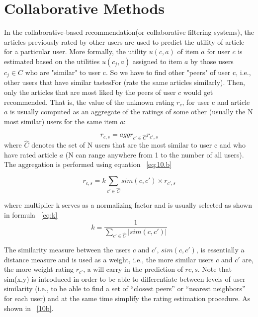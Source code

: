 \section{Collaborative Methods}\label{sec:coll}
In the collaborative-based recommendation(or collaborative filtering systems), the articles previously rated by other users are used to predict the utility of article for a particular user. More formally, the utility $u(c, a)$ of item $a$ for user $c$ is estimated based on the utilities $u(c_j, a)$ assigned to item $a$ by those users $c_j \in C$ who are "similar" to user c. So we have to find other "peers" of user c, i.e., other users that have similar tastesFor (rate the same articles similarly). Then, only the articles that are most liked by the peers of user $c$ would get recommended. 
That is, the value of the unknown rating $r_c$, for user c and article $a$ is usually computed as an aggregate of the ratings of some other (usually the N most similar) users for the same item $a$:

\begin{equation}\label{eq:9}
r_{c,s}=aggr_{c'\in \hat{C}} r_{c',s} 
\end{equation}
where $\hat{C}$ denotes the set of N users that are the most similar to user c and who have rated article $a$ (N can range anywhere from 1 to the number of all users). The aggregation is performed using equation ~\ref{eq:10.b}


\begin{equation}\label{eq:10.b}
r_{c,s}= k\sum_{ c'\in \hat{C}} sim(c,c')\times r_{c',s}
\end{equation}


where multiplier k serves as a normalizing factor and is usually selected as shown in formula ~\ref{eq:k}
\begin{equation}\label{eq:k}
k = \frac{1}{\sum_{c' \in \hat{C}} |sim(c,c')|}
\end{equation}

The similarity measure between the users $c$ and $c'$, $sim(c, c')$, is essentially a distance measure and is used as a weight, i.e., the more similar users $c$ and $c'$ are, the more weight rating $r_{c'}$, a will carry in the prediction of $r{c,s}$. Note that sim(x,y) is introduced in order to be able to differentiate between levels of user similarity (i.e., to be able to find a set of “closest peers” or “nearest neighbors” for each user) and at the same time simplify the rating estimation procedure. As shown in ~\ref{10b}.




